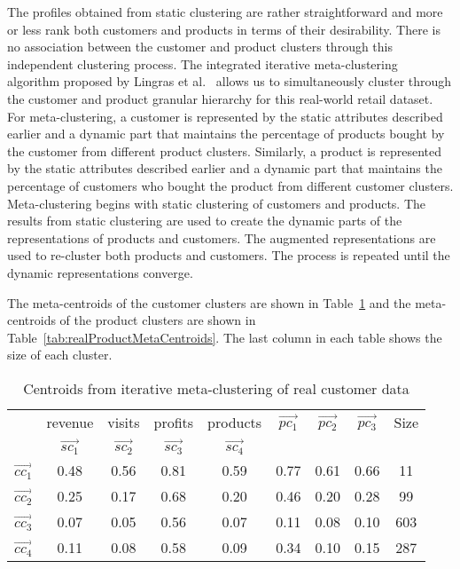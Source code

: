 \documentclass[oribibl]{llncs}
\begin{document}
The profiles obtained from static clustering are rather straightforward and more or
less rank both customers and products in terms of their desirability.
There is no association between the customer and product clusters through
this independent clustering process.
The integrated iterative meta-clustering algorithm proposed by Lingras et al.~\cite{Lingras2013}
allows us to simultaneously cluster through
the customer and product granular hierarchy for this real-world retail dataset.
For meta-clustering, a customer is represented by the static attributes described earlier and
a dynamic part that maintains the percentage of products bought by the customer from different product clusters.
Similarly,  a product is represented by the static attributes described earlier and
a dynamic part that maintains the percentage of customers who bought the product from different customer clusters.
Meta-clustering begins with static clustering of customers and products.
The results from static clustering are used to create the dynamic parts of the representations of
products and customers.
The augmented representations are used to re-cluster both products and customers.
The process is repeated until the dynamic representations converge.

The meta-centroids of the customer clusters are shown in 
Table~\ref{tab:realCustomerMetaCentroids} and
the meta-centroids of the product clusters are shown in 
Table~\ref{tab:realProductMetaCentroids}.
The last column in each table shows the size of each cluster.

\begin{table}[h]
	\caption{Centroids from iterative meta-clustering of real customer data }
\centering
\small
{\setlength{\tabcolsep}{0.3cm}
\begin{tabular}{|c|c|c|c|c||c|c|c|c|}
\hline
     & revenue & visits & profits &  products & $\vec{pc_1}$ & $\vec{pc_2}$ & $\vec{pc_3}$&Size\\

  & \textbf{$\vec{sc_1}$}  &    \textbf{$\vec{sc_2}$}&  \textbf{$\vec{sc_3}$} &  \textbf{$\vec{sc_4}$}&    &  & & \\
       \hline
\textbf{$\vec{cc_1}$} &  0.48  & 0.56  & 0.81  & 0.59 & 0.77 & 0.61 & 0.66 &11\\
  \hline
\textbf{$\vec{cc_2}$} &  0.25 & 0.17 & 0.68 & 0.20 & 0.46 & 0.20  & 0.28 &99\\
  \hline
\textbf{$\vec{cc_3}$} & 0.07 & 0.05 & 0.56 & 0.07  & 0.11  & 0.08 & 0.10 &603\\
  \hline
\textbf{$\vec{cc_4}$}& 0.11 & 0.08 & 0.58  & 0.09  & 0.34 & 0.10  & 0.15 &287\\
  \hline
\end{tabular}}
\label{tab:realCustomerMetaCentroids} 
\end{table}
\end{document}
